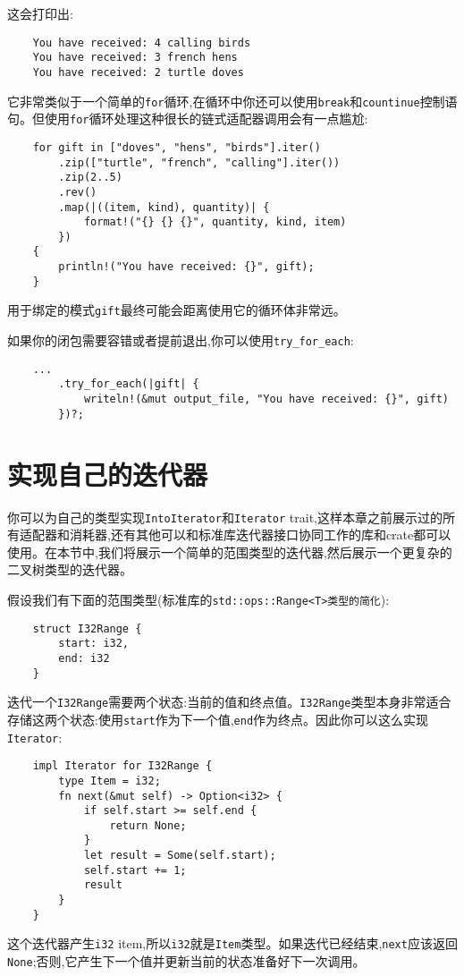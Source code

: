 这会打印出:
\begin{verbatim}
    You have received: 4 calling birds
    You have received: 3 french hens
    You have received: 2 turtle doves
\end{verbatim}

它非常类似于一个简单的\texttt{for}循环,在循环中你还可以使用\texttt{break}和\texttt{countinue}控制语句。但使用\texttt{for}循环处理这种很长的链式适配器调用会有一点尴尬:
\begin{verbatim}
    for gift in ["doves", "hens", "birds"].iter()
        .zip(["turtle", "french", "calling"].iter())
        .zip(2..5)
        .rev()
        .map(|((item, kind), quantity)| {
            format!("{} {} {}", quantity, kind, item)
        })
    {
        println!("You have received: {}", gift);
    }
\end{verbatim}

用于绑定的模式\texttt{gift}最终可能会距离使用它的循环体非常远。

如果你的闭包需要容错或者提前退出,你可以使用\texttt{try\_for\_each}:
\begin{verbatim}
    ...
        .try_for_each(|gift| {
            writeln!(&mut output_file, "You have received: {}", gift)
        })?;
\end{verbatim}

\section{实现自己的迭代器}

你可以为自己的类型实现\texttt{IntoIterator}和\texttt{Iterator} trait,这样本章之前展示过的所有适配器和消耗器,还有其他可以和标准库迭代器接口协同工作的库和crate都可以使用。在本节中,我们将展示一个简单的范围类型的迭代器,然后展示一个更复杂的二叉树类型的迭代器。

假设我们有下面的范围类型(标准库的\texttt{std::ops::Range<T>类型的简化}):
\begin{verbatim}
    struct I32Range {
        start: i32,
        end: i32
    }
\end{verbatim}

迭代一个\texttt{I32Range}需要两个状态:当前的值和终点值。\texttt{I32Range}类型本身非常适合存储这两个状态:使用\texttt{start}作为下一个值,\texttt{end}作为终点。因此你可以这么实现\texttt{Iterator}:
\begin{verbatim}
    impl Iterator for I32Range {
        type Item = i32;
        fn next(&mut self) -> Option<i32> {
            if self.start >= self.end {
                return None;
            }
            let result = Some(self.start);
            self.start += 1;
            result
        }
    }
\end{verbatim}
这个迭代器产生\texttt{i32} item,所以\texttt{i32}就是\texttt{Item}类型。如果迭代已经结束,\texttt{next}应该返回\texttt{None};否则,它产生下一个值并更新当前的状态准备好下一次调用。

